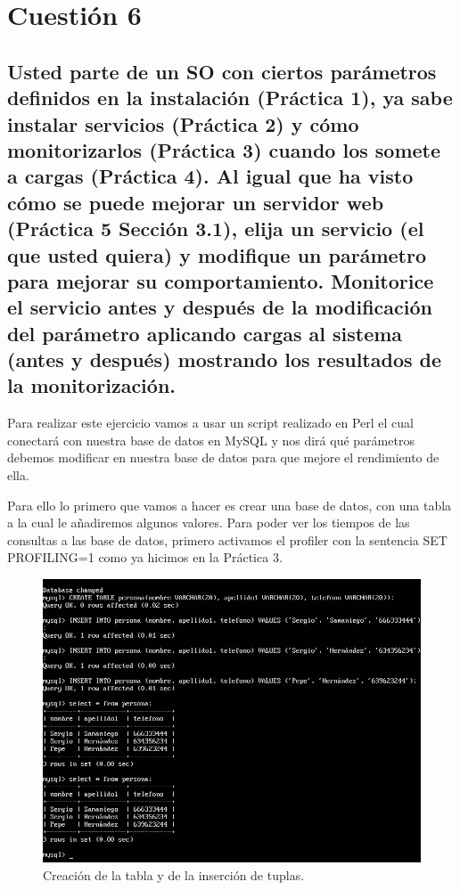 
\section{Cuestión 6}

\subsection{\Large Usted parte de un SO con ciertos parámetros definidos en la instalación (Práctica 1), ya sabe instalar servicios (Práctica 2) y cómo monitorizarlos (Práctica 3) cuando los somete a cargas (Práctica 4). Al igual que ha visto cómo se puede mejorar un servidor web (Práctica 5 Sección 3.1), elija un servicio (el que usted quiera) y modifique un parámetro para mejorar su comportamiento. Monitorice el servicio antes y después de la modificación del parámetro aplicando cargas al sistema (antes y después) mostrando los resultados de la monitorización.}

Para realizar este ejercicio vamos a usar un script realizado en Perl el cual conectará con nuestra base de datos en MySQL y nos dirá qué parámetros debemos modificar en nuestra base de datos para que mejore el rendimiento de ella.\cite{mysql}

Para ello lo primero que vamos a hacer es crear una base de datos, con una tabla a la cual le añadiremos algunos valores.
Para poder ver los tiempos de las consultas a las base de datos, primero activamos el profiler con la sentencia SET PROFILING=1 como ya hicimos en la Práctica 3.

\begin{figure}[H] %
	\centering
	\includegraphics[scale=0.5]{imagenes/create_persona.png}  %
	\caption{Creación de la tabla y de la inserción de tuplas.} \label{fig:figura18}
\end{figure}

